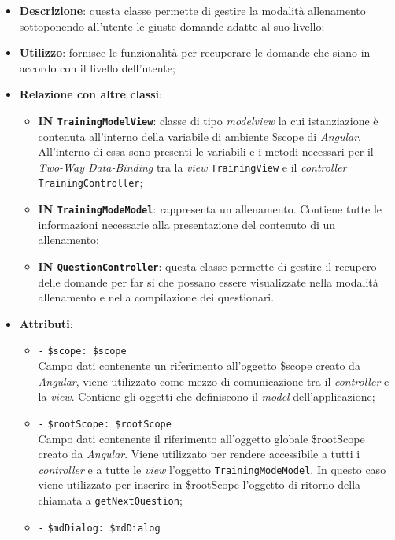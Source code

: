 \begin{itemize}
	\item \textbf{Descrizione}: questa classe permette di gestire la modalità allenamento sottoponendo all'utente le giuste domande adatte al suo livello;
	\item \textbf{Utilizzo}: fornisce le funzionalità per recuperare le domande che siano in accordo con il livello dell'utente;
	\item \textbf{Relazione con altre classi}:
	\begin{itemize}
		\item \textbf{IN \texttt{TrainingModelView}}: classe di tipo \textit{modelview} la cui istanziazione è contenuta all'interno della variabile di ambiente \$scope di \textit{Angular}. All'interno di essa sono presenti le variabili e i metodi necessari per il \textit{Two-Way Data-Binding} tra la \textit{view} \texttt{TrainingView} e il \textit{controller} \texttt{TrainingController};
		\item \textbf{IN \texttt{TrainingModeModel}}: rappresenta un allenamento. Contiene tutte le informazioni necessarie alla presentazione del contenuto di un allenamento;
		\item \textbf{IN \texttt{QuestionController}}: questa classe permette di gestire il recupero delle domande per far si che possano essere visualizzate nella modalità allenamento e nella compilazione dei questionari.
	\end{itemize}
	\item \textbf{Attributi}:
	\begin{itemize}
		\item \texttt{-} \texttt{\$scope: \$scope} \\
		Campo dati contenente un riferimento all'oggetto \$scope creato da \textit{Angular}, viene utilizzato come mezzo di comunicazione tra il \textit{controller} e la \textit{view}. Contiene gli oggetti che definiscono il \textit{model} dell'applicazione;
		\item \texttt{-} \texttt{\$rootScope: \$rootScope} \\
		Campo dati contenente il riferimento all'oggetto globale \$rootScope creato da \textit{Angular}. Viene utilizzato per rendere accessibile a tutti i \textit{controller} e a tutte le \textit{view} l'oggetto \texttt{TrainingModeModel}. In questo caso viene utilizzato per inserire in \$rootScope l'oggetto di ritorno della chiamata a \texttt{getNextQuestion};
		\item \texttt{-} \texttt{\$mdDialog: \$mdDialog} \\

\end{itemize}
\end{itemize}
